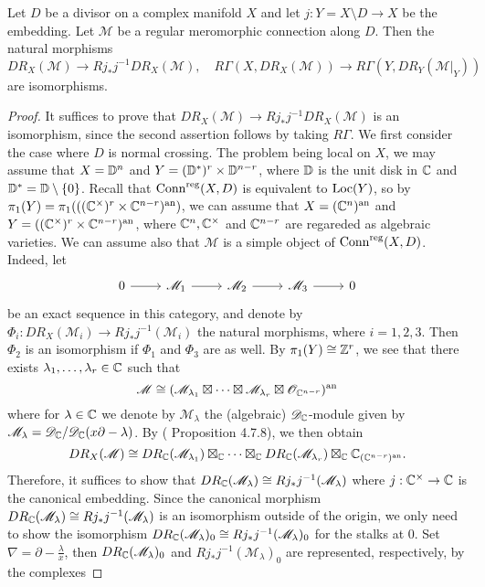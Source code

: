 \begin{theorem}\label{D-module mero conn regular de Rham functor isomorphism}
Let $D$ be a divisor on a complex manifold $X$ and let $j:Y=X\setminus D\to X$ be the embedding. Let $\mathscr{M}$ be a regular meromorphic connection along $D$. Then the natural morphisms
\[DR_X(\mathscr{M})\to Rj_*j^{-1}DR_X(\mathscr{M}),\quad R\Gamma(X,DR_X(\mathscr{M}))\to R\Gamma(Y,DR_Y(\mathscr{M}|_Y))\]
are isomorphisms.
\end{theorem}
\begin{proof}
It suffices to prove that $DR_X(\mathscr{M})\to Rj_*j^{-1}DR_X(\mathscr{M})$ is an isomorphism, since the second assertion follows by taking $R\Gamma$. We first consider the case where $D$ is normal crossing. The problem being local on $X$, we may assume that $X=\mathbb{D}^n$ and $Y=(\mathbb{D}^*)^r\times\mathbb{D}^{n-r}$, where $\mathbb{D}$ is the unit disk in $\mathbb{C}$ and $\mathbb{D}^*=\mathbb{D}\setminus\{0\}$. Recall that $\mathrm{Conn}^{\mathrm{reg}}(X,D)$ is equivalent to $\mathrm{Loc}(Y)$, so by $\pi_1(Y)=\pi_1(((\mathbb{C}^\times)^r\times\mathbb{C}^{n-r})^{\mathrm{an}})$, we can assume that $X=(\mathbb{C}^n)^{\mathrm{an}}$ and $Y=((\mathbb{C}^\times)^r\times\mathbb{C}^{n-r})^{\mathrm{an}}$, where $\mathbb{C}^n,\mathbb{C}^\times$ and $\mathbb{C}^{n-r}$ are regareded as algebraic varieties. We can assume also that $\mathscr{M}$ is a simple object of $\mathrm{Conn}^{\mathrm{reg}}(X,D)$. Indeed, let
\[\begin{tikzcd}
0\ar[r]&\mathscr{M}_1\ar[r]&\mathscr{M}_2\ar[r]&\mathscr{M}_3\ar[r]&0
\end{tikzcd}\]
be an exact sequence in this category, and denote by $\Phi_i:DR_X(\mathscr{M}_i)\to Rj_*j^{-1}(\mathscr{M}_i)$ the natural morphisms, where $i=1,2,3$. Then $\Phi_2$ is an isomorphism if $\Phi_1$ and $\Phi_3$ are as well. By $\pi_1(Y)\cong\mathbb{Z}^r$, we see that there exists $\lambda_1,\dots,\lambda_r\in\mathbb{C}$ such that
\begin{equation}
\mathscr{M}\cong(\mathscr{M}_{\lambda_1}\boxtimes\cdots\boxtimes\mathscr{M}_{\lambda_r}\boxtimes\mathscr{O}_{\mathbb{C}^{n-r}})^{\mathrm{an}}
\end{equation}
where for $\lambda\in\mathbb{C}$ we denote by $\mathscr{M}_\lambda$ the (algebraic) $\mathscr{D}_{\mathbb{C}}$-module given by $\mathscr{M}_\lambda=\mathscr{D}_{\mathbb{C}}/\mathscr{D}_{\mathbb{C}}(x\partial-\lambda)$. By (\cite{Hotta} Proposition 4.7.8), we then obtain
\[DR_X(\mathscr{M})\cong DR_{\mathbb{C}}(\mathscr{M}_{\lambda_1})\boxtimes_{\mathbb{C}}\cdots\boxtimes_{\mathbb{C}}DR_{\mathbb{C}}(\mathscr{M}_{\lambda_r})\boxtimes_{\mathbb{C}}\mathbb{C}_{(\mathbb{C}^{n-r})^{\mathrm{an}}}.\]
Therefore, it suffices to show that $DR_{\mathbb{C}}(\mathscr{M}_\lambda)\cong Rj_*j^{-1}(\mathscr{M}_\lambda)$ where $j:\mathbb{C}^\times\to\mathbb{C}$ is the canonical embedding. Since the canonical morphism $DR_{\mathbb{C}}(\mathscr{M}_\lambda)\cong Rj_*j^{-1}(\mathscr{M}_\lambda)$ is an isomorphism outside of the origin, we only need to show the isomorphism $DR_{\mathbb{C}}(\mathscr{M}_\lambda)_0\cong Rj_*j^{-1}(\mathscr{M}_\lambda)_0$ for the stalks at $0$. Set $\nabla=\partial-\frac{\lambda}{x}$, then $DR_{\mathbb{C}}(\mathscr{M}_\lambda)_0$ and $ Rj_*j^{-1}(\mathscr{M}_\lambda)_0$ are represented, respectively, by the complexes

\end{proof}
